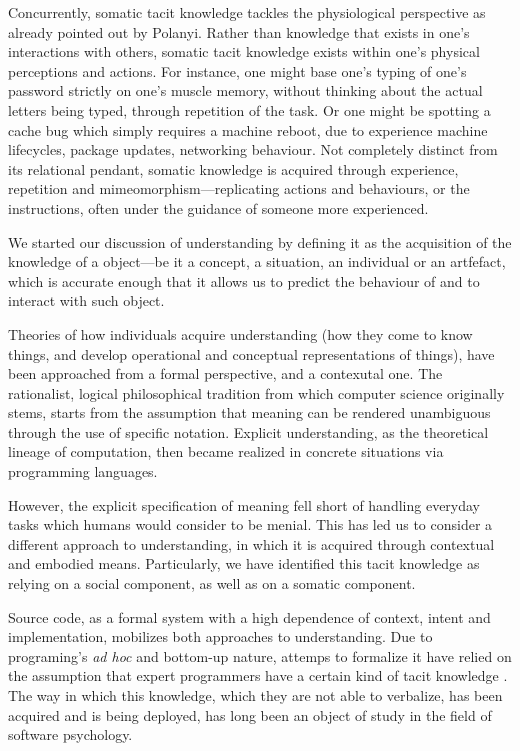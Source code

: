 Concurrently, somatic tacit knowledge tackles the physiological perspective as already pointed out by Polanyi. Rather than knowledge that exists in one's interactions with others, somatic tacit knowledge exists within one's physical perceptions and actions. For instance, one might base one's typing of one's password strictly on one's muscle memory, without thinking about the actual letters being typed, through repetition of the task. Or one might be spotting a cache bug which simply requires a machine reboot, due to experience machine lifecycles, package updates, networking behaviour. Not completely distinct from its relational pendant, somatic knowledge is acquired through experience, repetition and mimeomorphism—replicating actions and behaviours, or the instructions, often under the guidance of someone more experienced.


\spacersmall

We started our discussion of understanding by defining it as the acquisition of the knowledge of a object—be it a concept, a situation, an individual or an artfefact, which is accurate enough that it allows us to predict the behaviour of and to interact with such object.

Theories of how individuals acquire understanding (how they come to know things, and develop operational and conceptual representations of things), have been approached from a formal perspective, and a contexutal one. The rationalist, logical philosophical tradition from which computer science originally stems, starts from the assumption that meaning can be rendered unambiguous through the use of specific notation. Explicit understanding, as the theoretical lineage of computation, then became realized in concrete situations via programming languages.

However, the explicit specification of meaning fell short of handling everyday tasks which humans would consider to be menial. This has led us to consider a different approach to understanding, in which it is acquired through contextual and embodied means. Particularly, we have identified this tacit knowledge as relying on a social component, as well as on a somatic component.

Source code, as a formal system with a high dependence of context, intent and implementation, mobilizes both approaches to understanding. Due to programing's \emph{ad hoc} and bottom-up nature, attemps to formalize it have relied on the assumption that expert programmers have a certain kind of tacit knowledge \citep{soloway1982tapping,soloway_empirical_1984}. The way in which this knowledge, which they are not able to verbalize, has been acquired and is being deployed, has long been an object of study in the field of software psychology.

